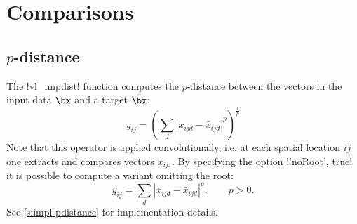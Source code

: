 \section{Comparisons}\label{s:comparisons}

\subsection{$p$-distance}\label{s:pdistance}

The !vl_nnpdist! function computes the $p$-distance between the vectors in the input data $\bx$ and a target $\bar\bx$:
\[
  y_{ij} = \left(\sum_d |x_{ijd} - \bar x_{ijd}|^p\right)^\frac{1}{p}
\]
Note that this operator is applied convolutionally, i.e. at each spatial location $ij$ one extracts and compares vectors $x_{ij:}$. By specifying the option !'noRoot', true! it is possible to compute a variant omitting the root:
\[
  y_{ij} = \sum_d |x_{ijd} - \bar x_{ijd}|^p, \qquad p > 0.
\]
See \cref{s:impl-pdistance} for implementation details.

%
%
%
%
%
%

